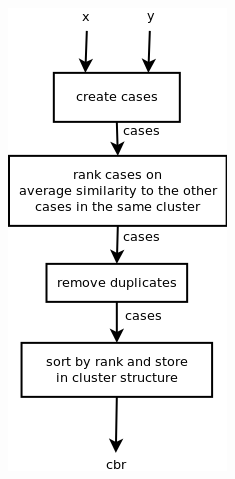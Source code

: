 \documentclass[11pt]{article}
\begin{document}
\includegraphics[width=\linewidth,height=\textheight,keepaspectratio]{init.png}
\newpage %
\end{document}
